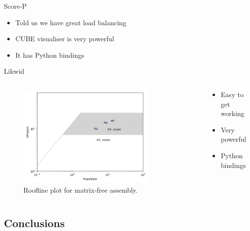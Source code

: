 \documentclass[pdf,aspectratio=169]{beamer}
\begin{document}
\begin{frame}{Score-P}
  \begin{itemize}
    \item Told us we have great load balancing
    \item CUBE visualiser is very powerful
    \item It has Python bindings
  \end{itemize}
\end{frame}

\begin{frame}{Likwid}
  \begin{columns}[T]
    \begin{column}{0.5\textwidth}
      \vspace{-2em}

      \begin{figure}
	\centering
	\includegraphics[width=0.8\textwidth]{roofline}
	\caption{Roofline plot for matrix-free assembly.}
      \end{figure}
    \end{column}
    \begin{column}{0.35\textwidth}
      \begin{itemize}
	\item Easy to get working
	\item Very powerful
	\item Python bindings
      \end{itemize}
    \end{column}
  \end{columns}
\end{frame}


\subsection{Conclusions}
\end{document}
